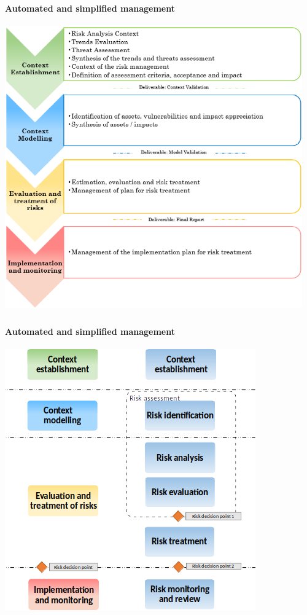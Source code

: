 \begin{frame}
    \frametitle{}
    \framesubtitle{Automated and simplified management}
    \begin{center}
        \includegraphics[scale=0.5]{./images/MONARC-method-2-1.png}
    \end{center}
\end{frame}


\begin{frame}
    \frametitle{}
    \framesubtitle{Automated and simplified management}
    \begin{center}
        \includegraphics[scale=0.5]{./images/MONARC-method-2-2.png}
    \end{center}
\end{frame}



